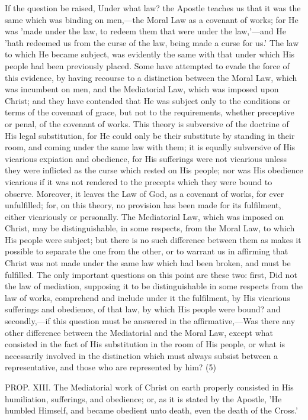 \documentclass[
]{book}
\begin{document}
If the question be raised, Under what law? the Apostle teaches us that it was the same which was binding on men,---the Moral Law as a covenant of works; for He was 'made under the law, to redeem them that were under the law,'---and He 'hath redeemed us from the curse of the law, being made a curse for us.' The law to which He became subject, was evidently the same with that under which His people had been previously placed. Some have attempted to evade the force of this evidence, by having recourse to a distinction between the Moral Law, which was incumbent on men, and the Mediatorial Law, which was imposed upon Christ; and they have contended that He was subject only to the conditions or terms of the covenant of grace, but not to the requirements, whether preceptive or penal, of the covenant of works. This theory is subversive of the doctrine of His legal substitution, for He could only be their substitute by standing in their room, and coming under the same law with them; it is equally subversive of His vicarious expiation and obedience, for His sufferings were not vicarious unless they were inflicted as the curse which rested on His people; nor was His obedience vicarious if it was not rendered to the precepts which they were bound to observe. Moreover, it leaves the Law of God, as a covenant of works, for ever unfulfilled; for, on this theory, no provision has been made for its fulfilment, either vicariously or personally. The Mediatorial Law, which was imposed on Christ, may be distinguishable, in some respects, from the Moral Law, to which His people were subject; but there is no such difference between them as makes it possible to separate the one from the other, or to warrant us in affirming that Christ was not made under the same law which had been broken, and must be fulfilled. The only important questions on this point are these two: first, Did not the law of mediation, supposing it to be distinguishable in some respects from the law of works, comprehend and include under it the fulfilment, by His vicarious sufferings and obedience, of that law, by which His people were bound? and secondly,---if this question must be answered in the affirmative,---Was there any other difference between the Mediatorial and the Moral Law, except what consisted in the fact of His substitution in the room of His people, or what is necessarily involved in the distinction which must always subsist between a representative, and those who are represented by him? (5)

PROP. XIII. The Mediatorial work of Christ on earth properly consisted in His humiliation, sufferings, and obedience; or, as it is stated by the Apostle, 'He humbled Himself, and became obedient unto death, even the death of the Cross.'
\end{document}
